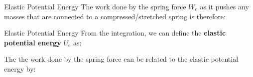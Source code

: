 \documentclass[12pt,compress,aspectratio=169]{beamer}
\begin{document}
\begin{frame}{Elastic Potential Energy}
  \vspace{-.15in}The work done by the spring force $W_e$ as it pushes any
  masses that are connected to a compressed/stretched spring is therefore:

%  
%
\end{frame}


\begin{frame}{Elastic Potential Energy}
  From the integration, we can define the \textbf{elastic potential energy}
  $U_e$ as:


  The the work done by the spring force can be related to the elastic
  potential energy by:
  

\end{frame}
\end{document}
